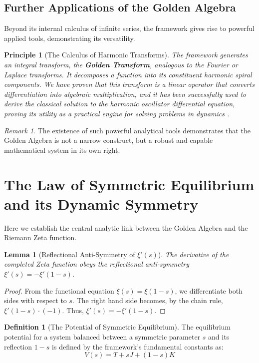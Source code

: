 \documentclass{article}
\theoremstyle{plain}
\newtheorem{lemma}[theorem]{Lemma}
\newtheorem{principle}[theorem]{Principle}
\theoremstyle{definition}
\newtheorem{definition}[theorem]{Definition}
\theoremstyle{remark}
\newtheorem*{remark}{Remark}
\begin{document}
\subsection{Further Applications of the Golden Algebra}
Beyond its internal calculus of infinite series, the framework gives rise to powerful applied tools, demonstrating its versatility.

\begin{principle}[The Calculus of Harmonic Transforms]
The framework generates an integral transform, the \textbf{Golden Transform}, analogous to the Fourier or Laplace transforms. It decomposes a function into its constituent harmonic spiral components. We have proven that this transform is a linear operator that converts differentiation into algebraic multiplication, and it has been successfully used to derive the classical solution to the harmonic oscillator differential equation, proving its utility as a practical engine for solving problems in dynamics \textbf{}.
\end{principle}

\begin{remark}
The existence of such powerful analytical tools demonstrates that the Golden Algebra is not a narrow construct, but a robust and capable mathematical system in its own right.
\end{remark}

\section{The Law of Symmetric Equilibrium and its Dynamic Symmetry}
Here we establish the central analytic link between the Golden Algebra and the Riemann Zeta function.

\begin{lemma}[Reflectional Anti-Symmetry of $\xi'(s)$]
\label{thm:xi_anti_symmetry}
The derivative of the completed Zeta function obeys the reflectional anti-symmetry $\xi'(s) = -\xi'(1-s)$.
\end{lemma}
\begin{proof}
From the functional equation $\xi(s) = \xi(1-s)$, we differentiate both sides with respect to $s$. The right hand side becomes, by the chain rule, $\xi'(1-s) \cdot (-1)$. Thus, $\xi'(s) = -\xi'(1-s)$.
\end{proof}

\begin{definition}[The Potential of Symmetric Equilibrium]
The equilibrium potential for a system balanced between a symmetric parameter $s$ and its reflection $1-s$ is defined by the framework's fundamental constants as:
$$V(s) = T + sJ + (1-s)K$$
\end{definition}
\end{document}
